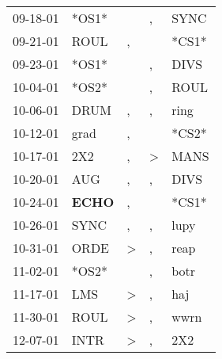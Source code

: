 \begin{supertabular}{p{0.07\textwidth}p{0.06\textwidth}p{0.02\textwidth}p{0.02\textwidth}p{0.06\textwidth}}
          09-18-01\textsuperscript{} &                            *OS1* &                  &             , &           SYNC\textsuperscript{} \\
          09-21-01\textsuperscript{} &           ROUL\textsuperscript{} &                , &               &                            *CS1* \\
          09-23-01\textsuperscript{} &                            *OS1* &                  &             , &           DIVS\textsuperscript{} \\
          10-04-01\textsuperscript{} &                            *OS2* &                  &             , &           ROUL\textsuperscript{} \\
          10-06-01\textsuperscript{} &           DRUM\textsuperscript{} &                , &             , &           ring\textsuperscript{} \\
          10-12-01\textsuperscript{} &           grad\textsuperscript{} &                , &               &                            *CS2* \\
          10-17-01\textsuperscript{} &            2X2\textsuperscript{} &                , &  \textgreater &           MANS\textsuperscript{} \\
          10-20-01\textsuperscript{} &            AUG\textsuperscript{} &                , &             , &           DIVS\textsuperscript{} \\
          10-24-01\textsuperscript{} &  \textbf{ECHO\textsuperscript{}} &                , &               &                            *CS1* \\
          10-26-01\textsuperscript{} &           SYNC\textsuperscript{} &                , &             , &           lupy\textsuperscript{} \\
          10-31-01\textsuperscript{} &           ORDE\textsuperscript{} &     \textgreater &             , &           reap\textsuperscript{} \\
          11-02-01\textsuperscript{} &                            *OS2* &                  &             , &           botr\textsuperscript{} \\
          11-17-01\textsuperscript{} &            LMS\textsuperscript{} &     \textgreater &             , &            haj\textsuperscript{} \\
          11-30-01\textsuperscript{} &           ROUL\textsuperscript{} &     \textgreater &             , &           wwrn\textsuperscript{} \\
          12-07-01\textsuperscript{} &           INTR\textsuperscript{} &     \textgreater &             , &            2X2\textsuperscript{} \\

\end{supertabular}
